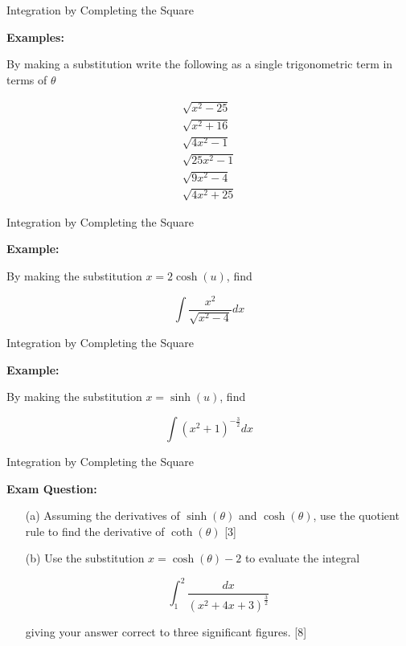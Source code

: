 \documentclass[10pt]{beamer}
\begin{document}
\begin{frame}{Integration by Completing the Square}

	\textbf{Examples:}
	
	By making a substitution write the following as a single trigonometric term in terms of $\theta$
	
	\begin{align*}
		\sqrt{x^2-25} \\
		\sqrt{x^2+16} \\
		\sqrt{4x^2-1} \\
		\sqrt{25x^2-1} \\
		\sqrt{9x^2 - 4} \\
		\sqrt{4x^2 + 25}
	\end{align*}
	
\end{frame}

\begin{frame}{Integration by Completing the Square}

	\textbf{Example:}
	
	By making the substitution $x = 2\cosh(u)$, find
	
	\begin{equation*}
		\int \frac{x^2}{\sqrt{x^2-4}} dx
	\end{equation*}

\end{frame}

\begin{frame}{Integration by Completing the Square}

	\textbf{Example:}
	
	By making the substitution $x = \sinh(u)$, find
	
	\begin{equation*}
		\int (x^2 + 1)^{-\frac{3}{2}} dx
	\end{equation*}

\end{frame}

\begin{frame}{Integration by Completing the Square}

	\textbf{Exam Question:}
	
	\begin{itemize}
	
		\item [(a)] Assuming the derivatives of $\sinh(\theta)$ and $\cosh(\theta)$, use the quotient rule to find the derivative of $\coth(\theta)$ \hfill[3]
		
		\item [(b)] Use the substitution $x = \cosh(\theta)-2$ to evaluate the integral
			
			\begin{equation*}
				\int_1^2 \frac{dx}{\left(x^2+4x+3\right)^{\frac32}}
			\end{equation*}		
			
		giving your answer correct to three significant figures. \hfill[8]

		
	\end{itemize}

\end{frame}
\end{document}
